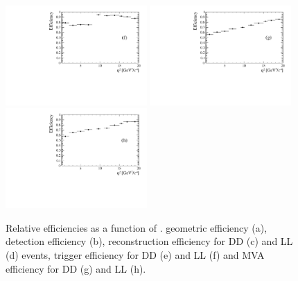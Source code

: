 \begin{figure}
\includegraphics[width=0.48\textwidth]{Lmumu/figs/efficiencies/BR/effvsq2_LL_mva.pdf}
\includegraphics[width=0.48\textwidth]{Lmumu/figs/efficiencies/BR/effvsq2_DD_trig.pdf}
\includegraphics[width=0.48\textwidth]{Lmumu/figs/efficiencies/BR/effvsq2_LL_trig.pdf}
\caption{Relative efficiencies as a function of \qsq. geometric efficiency (a), 
detection efficiency (b), reconstruction efficiency for DD (c) and LL (d) events, 
trigger efficiency for DD (e) and LL (f) and MVA efficiency for DD (g) and LL (h).}
\label{fig:Lb_relativeEff}
\end{figure}

\clearpage
